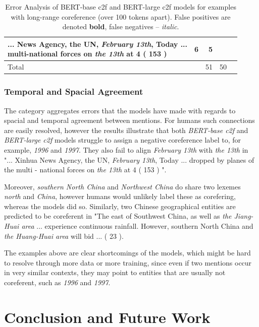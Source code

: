 \documentclass[11pt]{article}
\begin{document}
\begin{table}[b!]
\begin{tabular*}{\textwidth}{@{\extracolsep{\fill}} l *{4}{d{1.2}} }
{{... News Agency, the UN, \textit{February 13th}, Today ... \\  multi-national forces on \textit{the 13th} at 4 ( 153 ) 
}} & 6 & 5 \\
\midrule
Total &  & 51 & 50 \\
\bottomrule
\end{tabular*}
\caption{Error Analysis of BERT-base c2f and BERT-large c2f models for examples with long-range coreference (over 100 tokens apart). False positives are denoted \textbf{bold}, false negatives -- \textit{italic}. }
\label{table:error-over-100}
\end{table}

\subsubsection{Temporal and Spacial Agreement}
The category aggregates errors that the models have made with regards to spacial and temporal agreement between mentions. For humans such connections are easily resolved, however the results illustrate that both \textit{BERT-base c2f} and \textit{BERT-large c2f} models struggle to assign a negative coreference label to, for example, \textit{1996} and \textit{1997}. They also fail to align \textit{February 13th} with \textit{the 13th} in "... Xinhua News Agency, the UN, \textit{February 13th}, Today ... dropped by planes of the multi - national forces on \textit{the 13th} at 4 ( 153 ) ". 

Moreover, \textit{southern North China} and \textit{Northwest China} do share two lexemes \textit{north} and \textit{China}, however humans would unlikely label these as corefering, whereas the models did so. Similarly, two Chinese geographical entities are predicted to be coreferent in "The east of Southwest China, as well as \textit{the Jiang-Huai area} ... experience continuous rainfall. However, southern North China and \textit{the Huang-Huai area} will bid ... ( 23 ). 

The examples above are clear shortcomings of the models, which might be hard to resolve through more data or more training, since even if two mentions occur in very similar contexts, they may point to entities that are usually not coreferent, such as \textit{1996} and \textit{1997}. 


\section{Conclusion and Future Work}
\end{document}
